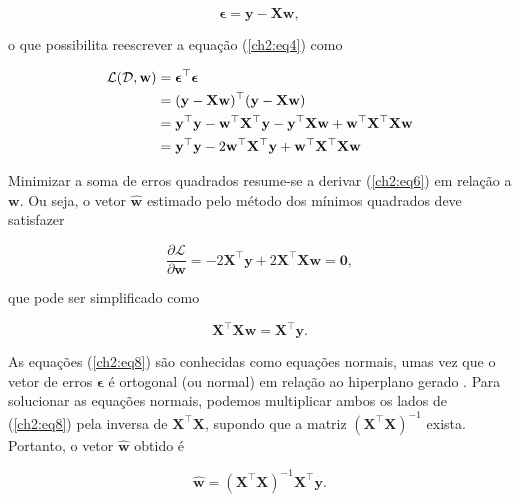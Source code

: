\begin{equation}
    \label{ch2:eq5}
    \boldsymbol{\epsilon} = \mathbf{y} - \mathbf{X}\mathbf{w},
\end{equation}

\noindent o que possibilita reescrever a equação (\ref{ch2:eq4}) como

\begin{align}
    \label{ch2:eq6}
    \mathcal{L}(\mathcal{D}, \mathbf{w})
    &= \boldsymbol{\epsilon}^{\top}\boldsymbol{\epsilon} \notag \\
    &= (\mathbf{y} - \mathbf{X}\mathbf{w})^{\top}(\mathbf{y} - \mathbf{X}\mathbf{w}) \notag \\
    &= \mathbf{y}^{\top}\mathbf{y} - \mathbf{w}^{\top}\mathbf{X}^{\top}\mathbf{y} - \mathbf{y}^{\top}\mathbf{X}\mathbf{w} + \mathbf{w}^{\top}\mathbf{X}^{\top}\mathbf{X}\mathbf{w} \notag \\
    &= \mathbf{y}^{\top}\mathbf{y} - 2\mathbf{w}^{\top}\mathbf{X}^{\top}\mathbf{y} + \mathbf{w}^{\top}\mathbf{X}^{\top}\mathbf{X}\mathbf{w}
\end{align}

Minimizar a soma de erros quadrados resume-se a derivar (\ref{ch2:eq6}) em relação a $\mathbf{w}$. Ou seja, o vetor $\mathbf{\hat{w}}$ estimado pelo método dos mínimos quadrados deve satisfazer

\begin{equation}
    \label{ch2:eq7}
    \frac{\partial \mathcal{L}}{\partial\mathbf{w}} = - 2\mathbf{X}^{\top}\mathbf{y} + 2\mathbf{X}^{\top}\mathbf{X}\mathbf{w} = \mathbf{0},
\end{equation}

\noindent que pode ser simplificado como

\begin{equation}
    \label{ch2:eq8}
    \mathbf{X}^{\top}\mathbf{X}\mathbf{w} = \mathbf{X}^{\top}\mathbf{y}.
\end{equation}

As equações (\ref{ch2:eq8}) são conhecidas como equações normais, umas vez que o vetor de erros $\boldsymbol{\epsilon}$ é ortogonal (ou normal) em relação ao hiperplano gerado \cite{bates1988}. Para solucionar as equações normais, podemos multiplicar ambos os lados de (\ref{ch2:eq8}) pela inversa de $\mathbf{X}^{\top}\mathbf{X}$, supondo que a matriz $(\mathbf{X}^{\top}\mathbf{X})^{-1}$ exista. Portanto, o vetor $\mathbf{\hat{w}}$ obtido é

\begin{equation}
    \label{ch2:eq9}
    \mathbf{\hat{w}} = (\mathbf{X}^{\top}\mathbf{X})^{-1}\mathbf{X}^{\top}\mathbf{y}.
\end{equation}

